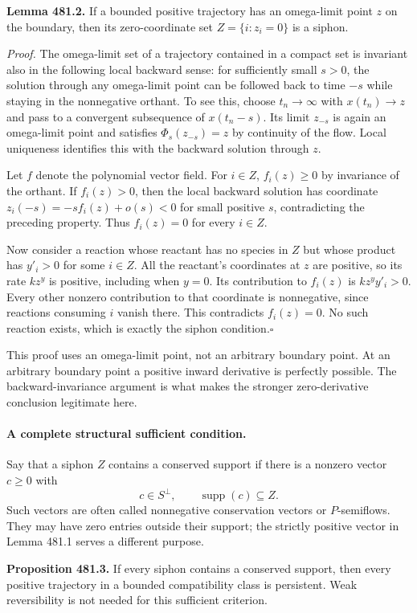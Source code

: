 \documentclass[11pt]{article}
\begin{document}
\textbf{Lemma 481.2.} If a bounded positive trajectory has an omega-limit
point $z$ on the boundary, then its zero-coordinate set
$Z=\{i:z_i=0\}$ is a siphon.

\emph{Proof.}
The omega-limit set of a trajectory contained in a compact set is invariant
also in the following local backward sense: for sufficiently small
$s>0$, the solution through any omega-limit point can be followed back
to time $-s$ while staying in the nonnegative orthant. To see this,
choose $t_n\to\infty$ with $x(t_n)\to z$ and pass to a convergent
subsequence of $x(t_n-s)$. Its limit $z_{-s}$ is again an omega-limit
point and satisfies $\Phi_s(z_{-s})=z$ by continuity of the flow.
Local uniqueness identifies this with the backward solution through $z$.

Let $f$ denote the polynomial vector field. For $i\in Z$,
$f_i(z)\geq0$ by invariance of the orthant. If $f_i(z)>0$, then the
local backward solution has coordinate
$z_i(-s)=-s f_i(z)+o(s)<0$ for small positive $s$, contradicting the
preceding property. Thus $f_i(z)=0$ for every $i\in Z$.

Now consider a reaction whose reactant has no species in $Z$ but whose
product has $y'_i>0$ for some $i\in Z$. All the reactant's coordinates
at $z$ are positive, so its rate $k z^y$ is positive, including when
$y=0$. Its contribution to $f_i(z)$ is $kz^y y'_i>0$.
Every other nonzero contribution to that coordinate is nonnegative,
since reactions consuming $i$ vanish there. This contradicts
$f_i(z)=0$. No such reaction exists, which is exactly the siphon
condition.\hfill$\square$

This proof uses an omega-limit point, not an arbitrary boundary point.
At an arbitrary boundary point a positive inward derivative is perfectly
possible. The backward-invariance argument is what makes the stronger
zero-derivative conclusion legitimate here.

\paragraph{A complete structural sufficient condition.}
Say that a siphon $Z$ contains a conserved support if there is a nonzero
vector $c\geq0$ with
\[
 c\in S^\perp,
 \qquad \operatorname{supp}(c)\subseteq Z.
\]
Such vectors are often called nonnegative conservation vectors or
$P$-semiflows. They may have zero entries outside their support; the
strictly positive vector in Lemma 481.1 serves a different purpose.

\textbf{Proposition 481.3.} If every siphon contains a conserved support,
then every positive trajectory in a bounded compatibility class is
persistent. Weak reversibility is not needed for this sufficient criterion.
\end{document}
